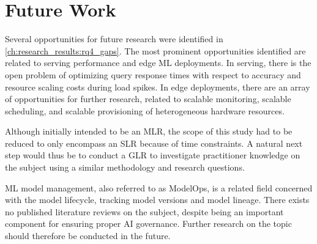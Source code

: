 \chapter{Future Work}
\label{ch:future_work}
Several opportunities for future research were identified in \cref{ch:research_results:rq4_gaps}.
The most prominent opportunities identified are related to serving performance and edge ML deployments.
In serving, there is the open problem of optimizing query response times with respect to accuracy and resource scaling costs during load spikes.
In edge deployments, there are an array of opportunities for further research, related to scalable monitoring, scalable scheduling, and scalable provisioning of heterogeneous hardware resources.

Although initially intended to be an MLR, the scope of this study had to be reduced to only encompass an SLR because of time constraints.
A natural next step would thus be to conduct a GLR to investigate practitioner knowledge on the subject using a similar methodology and research questions.

ML model management, also referred to as ModelOps, is a related field concerned with the model lifecycle, tracking model versions and model lineage.
There exists no published literature reviews on the subject, despite being an important component for ensuring proper AI governance.
Further research on the topic should therefore be conducted in the future.